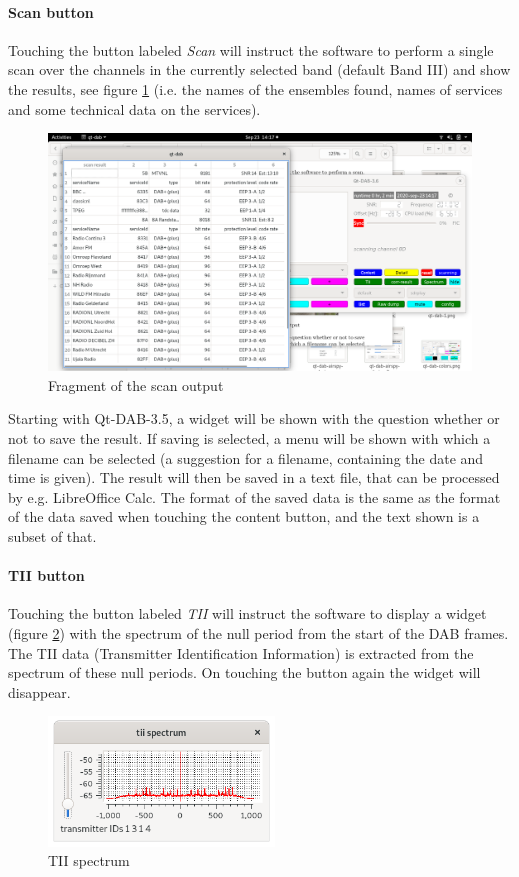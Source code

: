 \documentclass[12pt]{article}
\begin{document}
\paragraph{Scan button}
Touching the button labeled {\em Scan} will instruct the software to perform
a single scan over the channels in the currently selected band
(default Band III) and show the results, see
figure \ref{figure:scan-output} (i.e.
the names of the ensembles found, names of services and some technical data
on the services).
\begin{figure}[htp]
\centering
\includegraphics[width=120mm]{qt-dab-scan-button.png}
\caption{Fragment of the scan output}
\label{figure:scan-output}
\end{figure}
\par
Starting with Qt-DAB-3.5, a widget will be shown with the question whether
or not to save the result. If saving is selected, a menu will be shown
with which a filename can be selected (a suggestion for a filename,
containing the date and time is given). The result will then be saved
in a text file, that can be processed by e.g. LibreOffice Calc.
The format of the saved data is the same as the format of the data
saved when touching the content button, and the text shown is a subset of that.
\paragraph{TII button}
Touching the button labeled {\em TII} will instruct the software to
display a widget (figure \ref{figure:tii-spectrum}) with the
spectrum of the null period from the start of the DAB frames.
The TII data (Transmitter Identification Information)
is extracted from the spectrum of these null periods.
On touching the button again
the widget will disappear.
\begin{figure}
\centering
\includegraphics[width=60mm]{qt-dab-tii-button.png}
\caption{TII spectrum}
\label{figure:tii-spectrum}
\end{figure}
\end{document}
